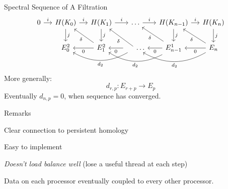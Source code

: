 \begin{frame}{Spectral Sequence of A Filtration}
{\[\begin{tikzcd}[ampersand replacement=\&, column sep=small]
0 \arrow{r}{i} \& H(K_0 \arrow{r}{i}\arrow{d}{j}) \& H(K_1 \arrow{r}{i}\arrow{d}{j})    \& \ldots \arrow{r}{i} \& H(K_{n-1}) \arrow{r}{i} \arrow{d}{j} \& H(K_n\arrow{d}{j}) \\ 		
\&     E^2_0 \&	  \arrow{l}{0} \arrow{ul}{\delta}  E^2_1 \& \arrow{l}{0} \arrow[bend left]{ll}{d_{2}} \arrow{ul}{\delta} \hspace{.5cm} \ldots  	 \& \arrow{l}{0} \arrow[bend left]{ll}{d_{2}} \arrow{ul}{\delta}E^1_{n-1}	 \& \arrow{l}{0} \arrow[bend left]{ll}{d_{2}} \arrow{ul}{\delta} E_n
\end{tikzcd}
\]
\pause
More generally:
\[ d_{r,p}: E_{r+p} \rightarrow E_p \]
Eventually $d_{n,p} = 0$, when sequence has converged.  
}
\end{frame}
\begin{frame}{Remarks}
\begin{description}
\item<1-> Clear connection to persistent homology
\item<2-> Easy to implement
\item<3-> \emph{Doesn't load balance well} (lose a useful thread at each step)
\item<4-> Data on each processor eventually coupled to every other processor.
\end{description}
\end{frame}